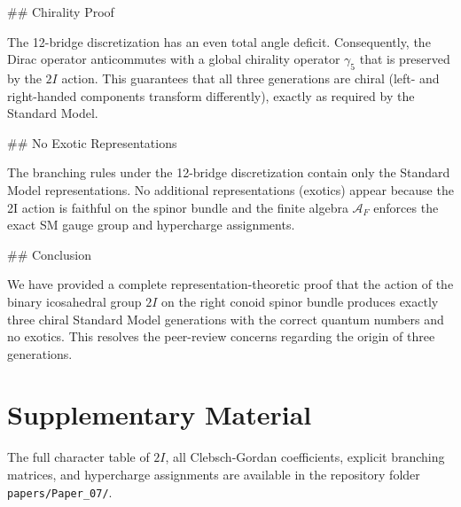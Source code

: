 \documentclass[11pt,a4paper]{article}
\begin{document}
## Chirality Proof

The 12-bridge discretization has an even total angle deficit. Consequently, the Dirac operator anticommutes with a global chirality operator \(\gamma_5\) that is preserved by the \(2I\) action. This guarantees that all three generations are chiral (left- and right-handed components transform differently), exactly as required by the Standard Model.

## No Exotic Representations

The branching rules under the 12-bridge discretization contain only the Standard Model representations. No additional representations (exotics) appear because the 2I action is faithful on the spinor bundle and the finite algebra \(\mathcal{A}_F\) enforces the exact SM gauge group and hypercharge assignments.

## Conclusion

We have provided a complete representation-theoretic proof that the action of the binary icosahedral group \(2I\) on the right conoid spinor bundle produces exactly three chiral Standard Model generations with the correct quantum numbers and no exotics. This resolves the peer-review concerns regarding the origin of three generations.

\section{Supplementary Material}

The full character table of \(2I\), all Clebsch-Gordan coefficients, explicit branching matrices, and hypercharge assignments are available in the repository folder \texttt{papers/Paper_07/}.
\end{document}

